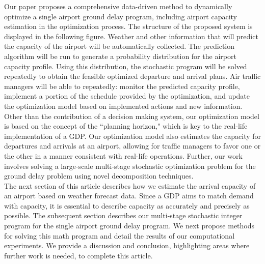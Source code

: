 \documentclass[12pt]{article}
\begin{document}
	\newline
	Our paper proposes a comprehensive data-driven method to dynamically optimize a single airport ground delay program, including airport capacity estimation in the optimization process. The structure of the proposed system is displayed in the following figure. Weather and other information that will predict the capacity of the airport will be automatically collected. The prediction algorithm will be run to generate a probability distribution for the airport capacity profile. Using this distribution, the stochastic program will be solved repeatedly to obtain the feasible optimized departure and arrival plans. Air traffic managers will be able to repeatedly: monitor the predicted capacity profile, implement a portion of the schedule provided by the optimization, and update the optimization model based on implemented actions and new information.\\
	\newline
	\noindent Other than the contribution of a decision making system, our optimization model is based on the concept of the ``planning horizon," which is key to the real-life implementation of a GDP.  Our optimization model also estimates the capacity for departures and arrivals at an airport, allowing for traffic managers to favor one or the other in a manner consistent with real-life operations. Further, our work involves solving a large-scale multi-stage stochastic optimization problem for the ground delay problem using novel decomposition techniques. \\
	\newline
	The next section of this article describes how we estimate the arrival capacity of an airport based on weather forecast data.  Since a GDP aims to match demand with capacity, it is essential to describe capacity as accurately and precisely as possible. The subsequent section describes our multi-stage stochastic integer program for the single airport ground delay program. We next propose methods for solving this math program and detail the results of our computational experiments.  We provide a discussion and conclusion, highlighting areas where further work is needed, to complete this article.
	
\end{document}
